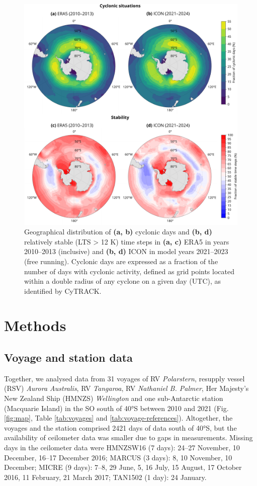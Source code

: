 \documentclass[12pt,a4paper]{article}
\begin{document}
\begin{figure}
\centering
\includegraphics[width=\textwidth]{img/cyc_stab_dist.pdf}
\caption{
Geographical distribution of \textbf{(a, b)} cyclonic days and \textbf{(b, d)}
relatively stable (LTS > 12 K) time steps in \textbf{(a, c)} ERA5 in years
2010--2013 (inclusive) and \textbf{(b, d)} ICON in model years 2021--2023 (free
running). Cyclonic days are expressed as a fraction of the number of days with
cyclonic activity, defined as grid points located within a double radius of any
cyclone on a given day (UTC), as identified by CyTRACK.
}
\label{fig:lts}
\end{figure}

\section{Methods}
\label{sec:methods}

\subsection{Voyage and station data}

Together, we analysed data from 31 voyages of RV \emph{Polarstern}, resupply
vessel (RSV) \emph{Aurora Australis}, RV \emph{Tangaroa}, RV \emph{Nathaniel B.
Palmer}, Her Majesty's New Zealand Ship (HMNZS) \emph{Wellington} and one
sub-Antarctic station (Macquarie Island) in the SO south of 40°S between 2010
and 2021 (Fig. \ref{fig:map}, Table \ref{tab:voyages} and
\ref{tab:voyage-references}). Altogether, the voyages and the station comprised
2421 days of data south of 40°S, but the availability of ceilometer data was
smaller due to gaps in measurements. Missing days in the ceilometer data were
HMNZSW16 (7 days): 24--27 November, 10 December, 16--17 December 2016; MARCUS
(3 days): 8, 10 November, 10 December; MICRE (9 days): 7--8, 29 June, 5, 16
July, 15 August, 17 October 2016, 11 February, 21 March 2017; TAN1502 (1 day):
24 January.
\end{document}
